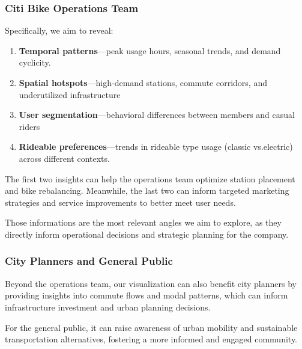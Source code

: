 \subsubsection{Citi Bike Operations Team}
Specifically, we aim to reveal:
\begin{enumerate}
  \item \textbf{Temporal patterns}---peak usage hours, seasonal trends, and demand cyclicity.
  \item \textbf{Spatial hotspots}---high-demand stations, commute corridors, and underutilized infrastructure
  \item \textbf{User segmentation}---behavioral differences between members and casual riders
  \item \textbf{Rideable preferences}---trends in rideable type usage (classic vs.\@ electric) across different contexts.
\end{enumerate}
The first two insights can help the operations team optimize station placement and bike rebalancing.
Meanwhile, the last two can inform targeted marketing strategies and service improvements to better meet user needs.

Those informations are the most relevant angles we aim to explore, as they directly inform operational decisions and strategic planning for the company.

\subsubsection{City Planners and General Public}
Beyond the operations team, our visualization can also benefit city planners by providing insights into commute 
flows and modal patterns, which can inform infrastructure investment and urban planning decisions.

For the general public, it can raise awareness of urban mobility and sustainable transportation alternatives, 
fostering a more informed and engaged community.
